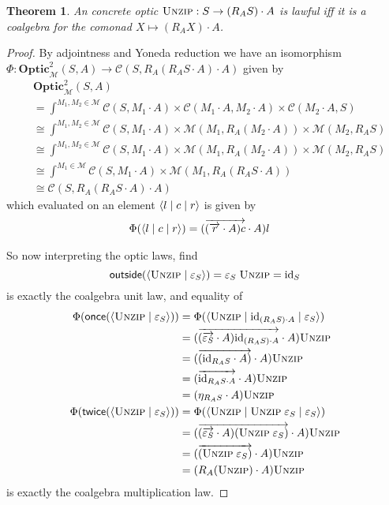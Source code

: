\documentclass[11pt,letterpaper]{article}
\theoremstyle{plain}
\newtheorem{theorem}{Theorem}[subsection]
\theoremstyle{definition}
\newcommand{\C}{\mathscr{C}}
\newcommand{\M}{\mathscr{M}}
\newcommand{\Twoptic}{\mathbf{Optic}^2}
\newcommand{\id}{\mathrm{id}}
\newcommand{\act}{\cdot}
\newcommand{\rep}[2]{{\ensuremath \left\langle #1 \mid #2 \right\rangle}}
\newcommand{\repthree}[3]{{\ensuremath \langle #1 \mid #2 \mid #3 \rangle}}
\newcommand{\funzip}{\textsc{Unzip}}
\newcommand{\outside}{\mathsf{outside}}
\newcommand{\once}{\mathsf{once}}
\newcommand{\twice}{\mathsf{twice}}
\begin{document}
\begin{theorem}\label{thm:optics-are-coalgebras}
An concrete optic $\funzip : S \to  (R_{A} S) \act A$ is lawful iff it is a coalgebra for the comonad $X \mapsto (R_{A} X) \act A$.
\end{theorem}
\begin{proof}
By adjointness and Yoneda reduction we have an isomorphism $\Phi : \Twoptic_\M(S, A) \to \C(S, R_A (R_A S \act A) \act A)$ given by
\begin{align*}
&\Twoptic_\M(S, A) \\
&= \int^{M_1, M_2 \in \M} \C(S, M_1 \act A) \times \C(M_1 \act A, M_2 \act A) \times \C(M_2 \act A, S) \\
&\cong \int^{M_1, M_2 \in \M} \C(S, M_1 \act A) \times \M(M_1, R_A (M_2 \act A)) \times \M(M_2, R_A S) \\
&\cong \int^{M_1, M_2 \in \M} \C(S, M_1 \act A) \times \M(M_1, R_A (M_2 \act A)) \times \M(M_2, R_A S) \\
&\cong \int^{M_1 \in \M} \C(S, M_1 \act A) \times \M(M_1, R_A (R_A S \act A)) \\
&\cong \C(S, R_A (R_A S \act A) \act A)
\end{align*}
  which evaluated on an element $\repthree{l}{c}{r}$ is given by
  \begin{align*}
    \Phi(\repthree{l}{c}{r}) &= (\overrightarrow{(\overrightarrow{r} \act A)c} \act A)l
  \end{align*}

So now interpreting the optic laws, find
\[\outside(\rep{\funzip}{\varepsilon_{S} }) = \varepsilon_{S} \; \funzip = \id_S \] is exactly the coalgebra unit law, and equality of
  \begin{align*}
    \Phi(\once(\rep{\funzip}{\varepsilon_S}))
    &= \Phi(\repthree{\funzip}{\id_{(R_{A} S) \act A}}{\varepsilon_S }) \\
    &= (\overrightarrow{(\overrightarrow{\varepsilon_S} \act A)\id_{(R_{A} S) \act A}} \act A)\funzip \\
    &= (\overrightarrow{(\id_{R_A S} \act A)} \act A)\funzip \\
    &= (\overrightarrow{\id_{R_A S \act A}} \act A)\funzip \\
    &= (\eta_{R_A S} \act A) \funzip \\
    \Phi(\twice(\rep{\funzip}{\varepsilon_S }))
    &= \Phi(\repthree{\funzip}{\funzip \; \varepsilon_S}{\varepsilon_S }) \\
    &= (\overrightarrow{(\overrightarrow{\varepsilon_S} \act A)(\funzip \; \varepsilon_S)} \act A)\funzip \\
    &= (\overrightarrow{(\funzip \; \varepsilon_S)} \act A)\funzip \\
    &= (R_A (\funzip) \act A)\funzip
  \end{align*}
is exactly the coalgebra multiplication law.
\end{proof}
\end{document}
